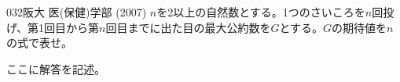 \begin{thm}{032}{}{阪大 医(保健)学部 (2007)}
 $n$を2以上の自然数とする。1つのさいころを$n$回投げ、第1回目から第$n$回目までに出た目の最大公約数を$G$とする。$G$の期待値を$n$の式で表せ。
\end{thm}

ここに解答を記述。